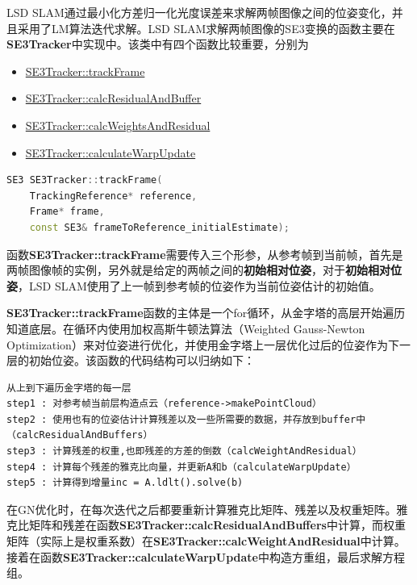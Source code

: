 LSD SLAM通过最小化方差归一化光度误差来求解两帧图像之间的位姿变化，并且采用了LM算法迭代求解。LSD SLAM求解两帧图像的SE3变换的函数主要在\textbf{SE3Tracker}中实现中。该类中有四个函数比较重要，分别为

\begin{itemize}
	\item \href{https://github.com/tum-vision/lsd_slam/blob/catkin/lsd_slam_core/src/Tracking/SE3Tracker.cpp#L280}{SE3Tracker::trackFrame}
	\item \href{https://github.com/tum-vision/lsd_slam/blob/catkin/lsd_slam_core/src/Tracking/SE3Tracker.cpp#L885}{SE3Tracker::calcResidualAndBuffer}
	\item \href{https://github.com/tum-vision/lsd_slam/blob/catkin/lsd_slam_core/src/Tracking/SE3Tracker.cpp#L749}{SE3Tracker::calcWeightsAndResidual}
	\item \href{https://github.com/tum-vision/lsd_slam/blob/catkin/lsd_slam_core/src/Tracking/SE3Tracker.cpp#L1277}{SE3Tracker::calculateWarpUpdate}
\end{itemize}


\begin{lstlisting}[language = C++]
SE3 SE3Tracker::trackFrame(
	TrackingReference* reference,
	Frame* frame,
	const SE3& frameToReference_initialEstimate);
\end{lstlisting}

函数\textbf{SE3Tracker::trackFrame}需要传入三个形参，从参考帧到当前帧，首先是两帧图像帧的实例，另外就是给定的两帧之间的\textbf{初始相对位姿}，对于\textbf{初始相对位姿}，LSD SLAM使用了上一帧到参考帧的位姿作为当前位姿估计的初始值。

\textbf{SE3Tracker::trackFrame}函数的主体是一个for循环，从金字塔的高层开始遍历知道底层。在循环内使用加权高斯牛顿法算法（Weighted Gauss-Newton Optimization）来对位姿进行优化，并使用金字塔上一层优化过后的位姿作为下一层的初始位姿。该函数的代码结构可以归纳如下：


\begin{lstlisting}
从上到下遍历金字塔的每一层
step1 : 对参考帧当前层构造点云（reference->makePointCloud）
step2 : 使用也有的位姿估计计算残差以及一些所需要的数据，并存放到buffer中（calcResidualAndBuffers）
step3 : 计算残差的权重,也即残差的方差的倒数（calcWeightAndResidual）
step4 : 计算每个残差的雅克比向量，并更新A和b（calculateWarpUpdate）
step5 : 计算得到增量inc = A.ldlt().solve(b)

\end{lstlisting}



在GN优化时，在每次迭代之后都要重新计算雅克比矩阵、残差以及权重矩阵。雅克比矩阵和残差在函数\textbf{SE3Tracker::calcResidualAndBuffers}中计算，而权重矩阵（实际上是权重系数）在\textbf{SE3Tracker::calcWeightAndResidual}中计算。接着在函数\textbf{SE3Tracker::calculateWarpUpdate}中构造方重组，最后求解方程组。


